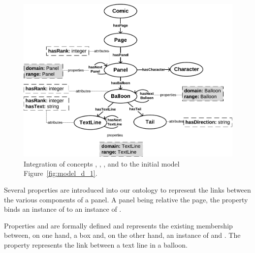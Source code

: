 \begin{figure}[h!]
\begin{center}
\includegraphics[width=1\textwidth]{model_step2_new.pdf}
\caption[Complete comics model]{Integration of concepts , , ,  and  to the initial model Figure~\ref{fig:model_d_1}.}
\label{fig:model_d_2}
\end{center}
\end{figure}

Several properties are introduced into our ontology to represent the links between the various components of a panel.
A panel being relative the page, the property  binds an instance of  to an instance of .

Properties  and  are formally defined and represents the existing membership between, on one hand, a box and, on the other hand, an instance of  and .
The property  represents the link between a text line in a balloon.

